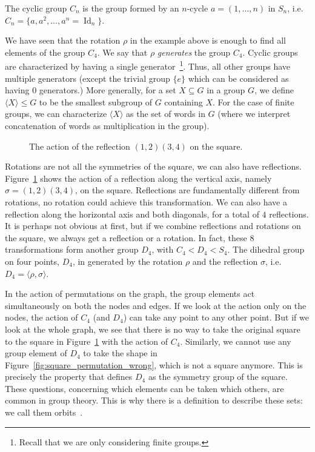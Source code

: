 \begin{defn}
     The cyclic group $C_n$ is the group formed by an $n$-cycle $a = (1,\ldots,n)$ in $S_n$, i.e. $C_n  = \{ a, a^2, \ldots, a^n = \operatorname{Id}_n \}$.
\end{defn}

We have seen that the rotation $\rho$ in the example above is enough to find all elements of the group $C_4$.
We say that $\rho$ \emph{generates} the group $C_4$.
Cyclic groups are characterized by having a single generator~\footnote{Recall that we are only considering finite groups.}.
Thus, all other groups have multiple generators (except the trivial group $\{ e \}$ which can be considered as having $0$ generators.)
More generally, for a set $X \subseteq G$ in a group $G$, we define $\langle X \rangle \leq G$ to be the smallest subgroup of $G$ containing $X$. 
For the case of finite groups, we can characterize $\langle X \rangle$ as the set of words in $G$ (where we interpret concatenation of words as multiplication in the group).

\begin{figure}[h]
	\centering
\resizebox{0.3\textwidth}{!}{
   \begin{tikzpicture}
     
   \end{tikzpicture}
 }
   \caption{The action of the reflection $(1,2)(3,4)$ on the square.}
   \label{fig:square_reflection}
\end{figure}

Rotations are not all the symmetries of the square, we can also have reflections. 
Figure~\ref{fig:square_reflection} shows the action of a reflection along the vertical axis, namely $\sigma = (1,2)(3,4)$, on the square. 
Reflections are fundamentally different from rotations, no rotation could achieve this transformation.
We can also have a reflection along the horizontal axis and both diagonals, for a total of $4$ reflections.
It is perhaps not obvious at first, but if we combine reflections and rotations on the square, we always get a reflection or a rotation.
In fact, these $8$ transformations form another group $D_4$, with $C_4 < D_4 < S_4$.
The dihedral group on four points, $D_4$, in generated by the rotation $\rho$ and the reflection $\sigma$, i.e. $D_4 = \langle \rho, \sigma \rangle$.

In the action of permutations on the graph, the group elements act simultaneously on both the nodes and edges.
If we look at the action only on the nodes, the action of $C_4$  (and $D_4$) can take any point to any other point.
But if we look at the whole graph, we see that there is no way to take the original square to the square in Figure~\ref{fig:square_reflection} with the action of $C_4$.
Similarly, we cannot use any group element of $D_4$ to take the shape in Figure~\ref{fig:square_permutation_wrong}, which is not a square anymore.
This is precisely the property that defines $D_4$ as the symmetry group of the square. 
These questions, concerning which elements can be taken which others, are common in group theory.
This is why there is a definition to describe these sets: we call them orbits~.


